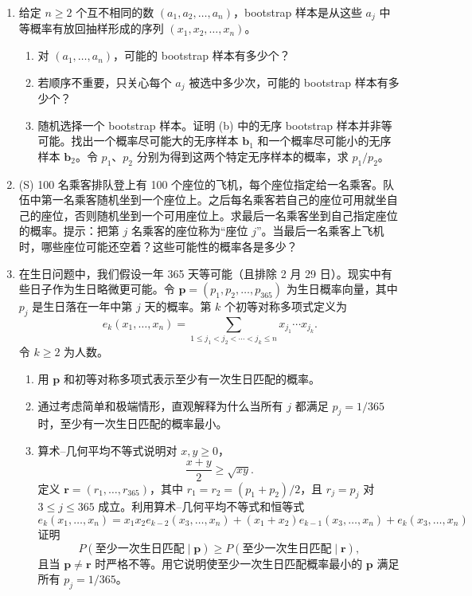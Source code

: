 \documentclass[UTF8, 12pt, fontset=fandol, oneside]{ctexart}
\begin{document}
\begin{enumerate}
  \item 给定 $n\ge2$ 个互不相同的数 $(a_1,a_2,\ldots,a_n)$，bootstrap 样本是从这些 $a_j$ 中等概率有放回抽样形成的序列 $(x_1,x_2,\ldots,x_n)$。
  \begin{enumerate}
    \item 对 $(a_1,\ldots,a_n)$，可能的 bootstrap 样本有多少个？
    \item 若顺序不重要，只关心每个 $a_j$ 被选中多少次，可能的 bootstrap 样本有多少个？
    \item 随机选择一个 bootstrap 样本。证明 (b) 中的无序 bootstrap 样本并非等可能。找出一个概率尽可能大的无序样本 $\mathbf b_1$ 和一个概率尽可能小的无序样本 $\mathbf b_2$。令 $p_1$、$p_2$ 分别为得到这两个特定无序样本的概率，求 $p_1/p_2$。
  \end{enumerate}

  \item (S) 100 名乘客排队登上有 100 个座位的飞机，每个座位指定给一名乘客。队伍中第一名乘客随机坐到一个座位上。之后每名乘客若自己的座位可用就坐自己的座位，否则随机坐到一个可用座位上。求最后一名乘客坐到自己指定座位的概率。提示：把第 $j$ 名乘客的座位称为“座位 $j$”。当最后一名乘客上飞机时，哪些座位可能还空着？这些可能性的概率各是多少？

  \item 在生日问题中，我们假设一年 365 天等可能（且排除 2 月 29 日）。现实中有些日子作为生日略微更可能。令 $\mathbf p=(p_1,p_2,\ldots,p_{365})$ 为生日概率向量，其中 $p_j$ 是生日落在一年中第 $j$ 天的概率。第 $k$ 个初等对称多项式定义为
  \[
    e_k(x_1,\ldots,x_n)
    =\sum_{1\le j_1<j_2<\cdots<j_k\le n}x_{j_1}\cdots x_{j_k}.
  \]
  令 $k\ge2$ 为人数。
  \begin{enumerate}
    \item 用 $\mathbf p$ 和初等对称多项式表示至少有一次生日匹配的概率。
    \item 通过考虑简单和极端情形，直观解释为什么当所有 $j$ 都满足 $p_j=1/365$ 时，至少有一次生日匹配的概率最小。
    \item 算术--几何平均不等式说明对 $x,y\ge0$，
    \[
      \frac{x+y}{2}\ge\sqrt{xy}.
    \]
    定义 $\mathbf r=(r_1,\ldots,r_{365})$，其中 $r_1=r_2=(p_1+p_2)/2$，且 $r_j=p_j$ 对 $3\le j\le365$ 成立。利用算术--几何平均不等式和恒等式
    \[
      e_k(x_1,\ldots,x_n)
      =x_1x_2e_{k-2}(x_3,\ldots,x_n)
      +(x_1+x_2)e_{k-1}(x_3,\ldots,x_n)
      +e_k(x_3,\ldots,x_n)
    \]
    证明
    \[
      P(\text{至少一次生日匹配}\mid\mathbf p)
      \ge
      P(\text{至少一次生日匹配}\mid\mathbf r),
    \]
    且当 $\mathbf p\ne\mathbf r$ 时严格不等。用它说明使至少一次生日匹配概率最小的 $\mathbf p$ 满足所有 $p_j=1/365$。
  \end{enumerate}
\end{enumerate}
\end{document}
